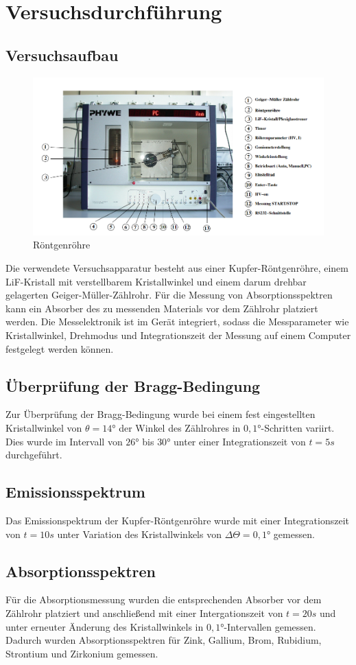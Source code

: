 \section{Versuchsdurchführung}
\subsection{Versuchsaufbau}
\begin{figure}[h]
    \centering
    \includegraphics{Röntgenröhre}
    \caption{Röntgenröhre}
  \end{figure}
Die verwendete Versuchsapparatur besteht aus einer Kupfer-Röntgenröhre, einem LiF-Kristall mit verstellbarem Kristallwinkel und einem darum drehbar gelagerten Geiger-Müller-Zählrohr. Für die Messung von Absorptionsspektren kann ein Absorber des zu messenden Materials vor dem Zählrohr platziert werden. Die Messelektronik ist im Gerät integriert, sodass die Messparameter wie Kristallwinkel, Drehmodus und Integrationszeit der Messung auf einem Computer festgelegt werden können.
\subsection{Überprüfung der Bragg-Bedingung}
Zur Überprüfung der Bragg-Bedingung wurde bei einem fest eingestellten Kristallwinkel von $\theta=14°$ der Winkel des Zählrohres in $0,1°$-Schritten variirt. Dies wurde im Intervall von $26°$ bis $30°$ unter einer Integrationszeit von $t=5s$ durchgeführt.
\subsection{Emissionsspektrum}
Das Emissionspektrum der Kupfer-Röntgenröhre wurde mit einer Integrationszeit von $t=10s$ unter Variation des Kristallwinkels von $\Delta \Theta=0,1°$ gemessen.
\subsection{Absorptionsspektren}
Für die Absorptionsmessung wurden die entsprechenden Absorber vor dem Zählrohr platziert und anschließend mit einer Intergationszeit von $t=20s$ und unter erneuter Änderung des Kristallwinkels in $0,1°$-Intervallen gemessen. Dadurch wurden Absorptionsspektren für Zink, Gallium, Brom, Rubidium, Strontium und Zirkonium gemessen. 


  
